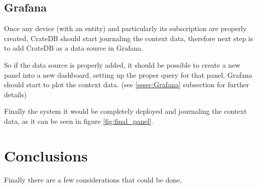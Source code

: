 \documentclass[11pt,a4paper,dvipsnames,twoside]{article}
\begin{document}
\subsection{Grafana}
Once any device (with an entity) and particularly its subscription are properly created, CrateDB should start journaling the context data, therefore next step is to add CrateDB as a data source in Grafana. 

So if the data source is properly added, it should be possible to create a new panel into a new dashboard, setting up the proper query for that panel, Grafana should start to plot the context data. (see \ref{sssec:Grafana} subsection for further details)

Finally the system it would be completely deployed and journaling the context data, as it can be seen in figure \ref{fig:final_panel}.

\clearpage{\pagestyle{empty}\cleardoublepage}\pagestyle{plain}  %
\section{Conclusions}
Finally there are a few considerations that could be done, 
\end{document}

